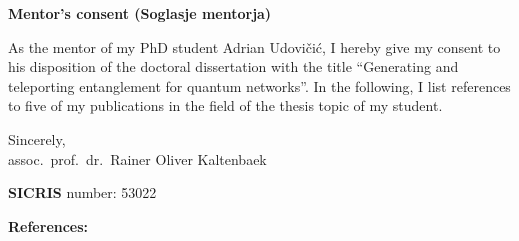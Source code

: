 \documentclass{article}
\begin{document}
\clearpage
\pagestyle{plain}
\vspace{1cm}
\setcounter{page}{3}
\begin{center}
	\textbf{Mentor's consent (Soglasje mentorja)}

	\noindent As the mentor of my PhD student Adrian Udovičić, I hereby give my consent to his disposition of the doctoral dissertation with the title ``Generating and teleporting entanglement for quantum networks''.
	In the following, I list references to five of my publications in the field of the thesis topic of my student.
\end{center}
\vspace{0.5cm}

Sincerely,\\
\noindent assoc.~prof.~dr.~Rainer Oliver Kaltenbaek\

\vspace{1cm}

\noindent \textbf{SICRIS} number: 53022

\noindent \textbf{References: \cite{prevedel2007high,kaltenbaek2009high,kaltenbaek2021quantum,ribezzo2023deploying,puvsavec2024designing}}



\vspace{1cm}
\end{document}

